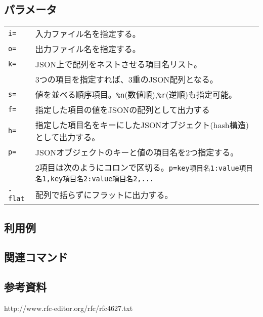 \subsection*{パラメータ}
\begin{table}[htbp]
{\small
\begin{tabular}{ll}
\verb|i=|    & 入力ファイル名を指定する。\\
\verb|o=|    & 出力ファイル名を指定する。\\
\verb|k=|    & JSON上で配列をネストさせる項目名リスト。\\
             & 3つの項目を指定すれば、3重のJSON配列となる。\\
\verb|s=|    & 値を並べる順序項目。\verb|%n|(数値順),\verb|%r|(逆順)も指定可能。\\
\verb|f=|    & 指定した項目の値をJSONの配列として出力する\\
\verb|h=|    & 指定した項目名をキーにしたJSONオブジェクト(hash構造)として出力する。\\
\verb|p=|    & JSONオブジェクトのキーと値の項目名を2つ指定する。\\
             & 2項目は次のようにコロンで区切る。\verb|p=key項目名1:value項目名1,key項目名2:value項目名2,...|\\
\verb|-flat| & 配列で括らずにフラットに出力する。\\
\end{tabular} 
}
\end{table} 


\subsection*{利用例}

\subsection*{関連コマンド}

\subsection*{参考資料}
http://www.rfc-editor.org/rfc/rfc4627.txt

%
